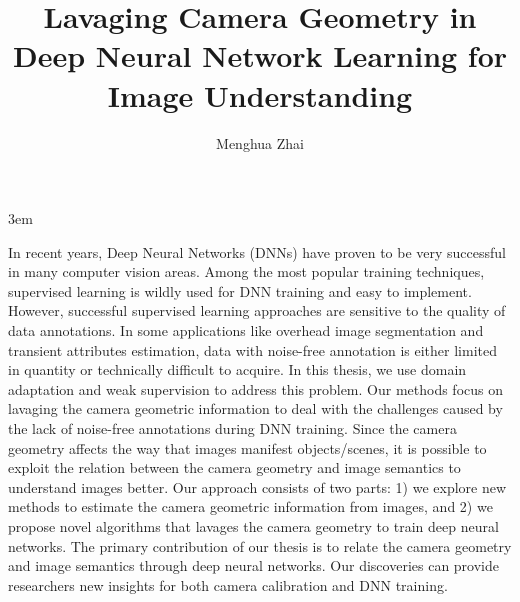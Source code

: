 \documentclass[final]{ukthesis}
\begin{document}
\emergencystretch 3em

\author{Menghua Zhai}
\title{Lavaging Camera Geometry in Deep Neural Network Learning for Image Understanding}

\abstract
{ \SingleSpacing
In recent years, Deep Neural Networks (DNNs) have proven to be very
successful in many computer vision areas. Among the most popular
training techniques, supervised learning is wildly used for DNN
training and easy to implement. However, successful supervised
learning approaches are sensitive to the quality of data
annotations. In some applications like overhead image segmentation and
transient attributes estimation, data with noise-free annotation is
either limited in quantity or technically difficult to acquire.
In this thesis, we use domain adaptation and weak supervision to
address this problem. Our methods focus on lavaging the camera
geometric information to deal with the challenges caused by the lack
of noise-free annotations during DNN training.
Since the camera geometry affects the way that images manifest
objects/scenes, it is possible to exploit the relation between the
camera geometry and image semantics to understand images better.
Our approach consists of two parts: 1) we explore new methods
to estimate the camera geometric information from images, and 2) 
we propose novel algorithms that lavages the camera geometry to train
deep neural networks.
The primary contribution of our thesis is to relate the camera
geometry and image semantics through deep neural networks. Our
discoveries can provide researchers new insights for both camera
calibration and DNN training.
}


\frontmatter
\maketitle



\tableofcontents\clearpage

\mainmatter




\backmatter




\end{document}
